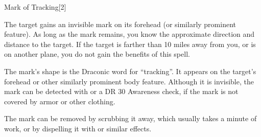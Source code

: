 \begin{spellsection}{Mark of Tracking}[2]
    \begin{spellheader}
    \end{spellheader}
    \begin{spellcontent}
        \begin{spelltargetinginfo}
        \end{spelltargetinginfo}
        \begin{spelleffects}
            \spelleffect The target gains an invisible mark on its forehead (or similarly prominent feature).
            As long as the mark remains, you know the approximate direction and distance to the target.
            If the target is farther than 10 miles away from you, or is on another plane, you do not gain the benefits of this spell.
            \spelldur \durlong
        \end{spelleffects}
    \end{spellcontent}
    \begin{spellfooter}
        \spellnotes The mark's shape is the Draconic word for ``tracking''.
        It appears on the target's forehead or other similarly prominent body feature.
        Although it is invisible, the mark can be detected with  or a DR 30 Awareness check, if the mark is not covered by armor or other clothing.

        The mark can be removed by scrubbing it away, which usually takes a minute of work, or by dispelling it with  or similar effects.
        \miscastrandom
    \end{spellfooter}
    \begin{spellaugments}
    \end{spellaugments}
\end{spellsection}

